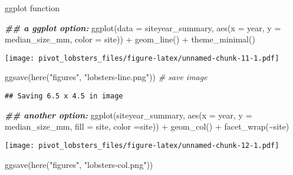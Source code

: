 \documentclass[
]{article}
\newenvironment{Shaded}{\begin{snugshade}}{\end{snugshade}}
\newcommand{\AttributeTok}[1]{\textcolor[rgb]{0.77,0.63,0.00}{#1}}
\newcommand{\CommentTok}[1]{\textcolor[rgb]{0.56,0.35,0.01}{\textit{#1}}}
\newcommand{\DocumentationTok}[1]{\textcolor[rgb]{0.56,0.35,0.01}{\textbf{\textit{#1}}}}
\newcommand{\FunctionTok}[1]{\textcolor[rgb]{0.00,0.00,0.00}{#1}}
\newcommand{\NormalTok}[1]{#1}
\newcommand{\SpecialCharTok}[1]{\textcolor[rgb]{0.00,0.00,0.00}{#1}}
\newcommand{\StringTok}[1]{\textcolor[rgb]{0.31,0.60,0.02}{#1}}
\begin{document}
ggplot function

\begin{Shaded}
\begin{Highlighting}[]
\DocumentationTok{\#\# a ggplot option:}
\FunctionTok{ggplot}\NormalTok{(}\AttributeTok{data =}\NormalTok{ siteyear\_summary, }\FunctionTok{aes}\NormalTok{(}\AttributeTok{x =}\NormalTok{ year, }\AttributeTok{y =}\NormalTok{ median\_size\_mm, }\AttributeTok{color =}\NormalTok{ site)) }\SpecialCharTok{+}
  \FunctionTok{geom\_line}\NormalTok{() }\SpecialCharTok{+}
  \FunctionTok{theme\_minimal}\NormalTok{()}
\end{Highlighting}
\end{Shaded}

\texttt{[image: pivot\_lobsters\_files/figure-latex/unnamed-chunk-11-1.pdf]}

\begin{Shaded}
\begin{Highlighting}[]
\FunctionTok{ggsave}\NormalTok{(}\FunctionTok{here}\NormalTok{(}\StringTok{"figures"}\NormalTok{, }\StringTok{"lobsters{-}line.png"}\NormalTok{)) }\CommentTok{\# save image}
\end{Highlighting}
\end{Shaded}

\begin{verbatim}
## Saving 6.5 x 4.5 in image
\end{verbatim}

\begin{Shaded}
\begin{Highlighting}[]
\DocumentationTok{\#\# another option:}
\FunctionTok{ggplot}\NormalTok{(siteyear\_summary, }\FunctionTok{aes}\NormalTok{(}\AttributeTok{x =}\NormalTok{ year, }\AttributeTok{y =}\NormalTok{ median\_size\_mm, }\AttributeTok{fill =}\NormalTok{ site, }\AttributeTok{color =}\NormalTok{site)) }\SpecialCharTok{+}
  \FunctionTok{geom\_col}\NormalTok{() }\SpecialCharTok{+}
  \FunctionTok{facet\_wrap}\NormalTok{(}\SpecialCharTok{\textasciitilde{}}\NormalTok{site)}
\end{Highlighting}
\end{Shaded}

\texttt{[image: pivot\_lobsters\_files/figure-latex/unnamed-chunk-12-1.pdf]}

\begin{Shaded}
\begin{Highlighting}[]
\FunctionTok{ggsave}\NormalTok{(}\FunctionTok{here}\NormalTok{(}\StringTok{"figures"}\NormalTok{, }\StringTok{"lobsters{-}col.png"}\NormalTok{))}
\end{Highlighting}
\end{Shaded}
\end{document}
